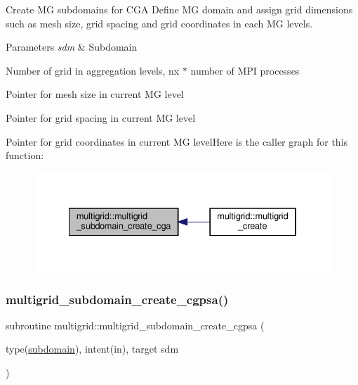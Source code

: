 Create MG subdomains for C\+GA  Define MG domain and assign grid dimensions such as mesh size, grid spacing and grid coordinates in each MG levels. 


\begin{DoxyParams}{Parameters}
{\em sdm} & Subdomain \\
\hline
\end{DoxyParams}
Number of grid in aggregation levels, nx $\ast$ number of M\+PI processes

Pointer for mesh size in current MG level

Pointer for grid spacing in current MG level

Pointer for grid coordinates in current MG levelHere is the caller graph for this function\+:
\nopagebreak
\begin{figure}[H]
\begin{center}
\leavevmode
\includegraphics[width=334pt]{namespacemultigrid_ae33e2e076cc087e7d149a3150c1ca1af_icgraph}
\end{center}
\end{figure}
\mbox{\label{namespacemultigrid_aa2eb7c900fb5875f844c04c27c552373}} 
\subsubsection{\texorpdfstring{multigrid\+\_\+subdomain\+\_\+create\+\_\+cgpsa()}{multigrid\_subdomain\_create\_cgpsa()}}
{\footnotesize\ttfamily subroutine multigrid\+::multigrid\+\_\+subdomain\+\_\+create\+\_\+cgpsa (\begin{DoxyParamCaption}\item[{type(\hyperlink{structgeometry_1_1subdomain}{subdomain}), intent(in), target}]{sdm }\end{DoxyParamCaption})}



